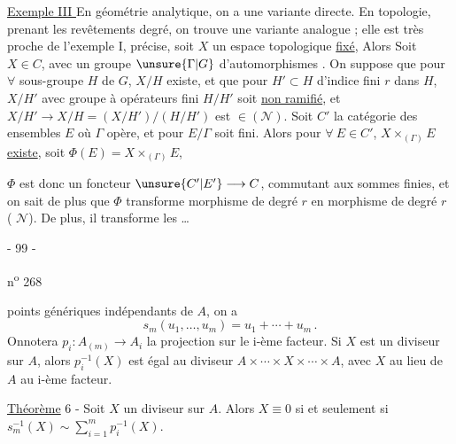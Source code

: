 \uline{Exemple III }  En géométrie analytique, on a une variante directe. En topologie, prenant les revêtements    degré, on trouve une variante analogue ; elle est très proche de l'exemple I,   précise, soit $X$ un espace topologique \uline{fixé},  Alors
Soit $X\in C$, avec un groupe $\unsure{\Gamma|G}$ d'automorphismes . On suppose que pour $\forall$ sous-groupe $H$ de $G$,  $X/H$ existe, et que pour $H'\subset H$  d'indice fini $r$ dans $H$,   $X/H'$ avec groupe à opérateurs fini $H/H'$ soit \uline{non ramifié}, et $X/H'\longrightarrow X/H=(X/H')/(H/H')$ est $\in(\mathcal N)$. Soit $C'$ la catégorie des ensembles $E$ où $\Gamma$ opère, et pour $E/\Gamma$ soit fini. Alors  pour $\forall\ E\in C'$, $X\times_{(\Gamma)}E$ \uline{existe}, soit $\Phi(E)=X\times_{(\Gamma)}E$,

$\Phi$ est donc un foncteur $\unsure{C'|E'}\longrightarrow C$, commutant aux sommes finies, et on sait de plus que $\Phi$ transforme morphisme de degré $r$ en morphisme de degré $r$ ( $\mathcal N$). De plus, il transforme   les \ldots
{}
\begin{center}- 99 -\end{center}\hfill n\textsuperscript{o} 268

points génériques indépendants de $A$, on a
\[
s_m(u_1,\ldots,u_m)=u_1+\cdots+u_m\,.
\]
Onnotera $p_i:A_{(m)}\longrightarrow A_i$ la projection sur le i-ème facteur. Si $X$ est un diviseur sur $A$, alors $p_i^{-1}(X)$ est égal au diviseur $A\times\cdots\times X\times\cdots\times A$, avec $X$ au lieu de $A$ au i-ème facteur.

\uline{Théorème} 6 - Soit $X$ un diviseur sur $A$. Alors $X\equiv0$ si et seulement si $s_m^{-1}(X)\sim\sum_{i=1}^m p_i^{-1}(X)$.

